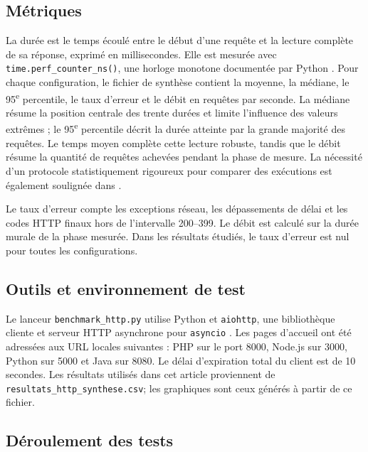 \documentclass[conference,11pt]{IEEEtran}
\begin{document}
\subsection{Métriques}

La durée est le temps écoulé entre le début d'une requête et la lecture
complète de sa réponse, exprimé en millisecondes. Elle est mesurée avec
\texttt{time.perf\_counter\_ns()}, une horloge monotone documentée par Python
\cite{python-time}. Pour chaque
configuration, le fichier de synthèse contient la moyenne, la médiane, le
95\textsuperscript{e} percentile, le taux d'erreur et le débit en requêtes par seconde.
La médiane résume la position centrale des trente durées et limite
l'influence des valeurs extrêmes ; le 95\textsuperscript{e} percentile décrit la durée
atteinte par la grande majorité des requêtes. Le temps moyen complète cette
lecture robuste, tandis que le débit résume la quantité de requêtes achevées
pendant la phase de mesure. La nécessité d'un protocole statistiquement
rigoureux pour comparer des exécutions est également soulignée dans
\cite{georges}.

Le taux d'erreur compte les exceptions réseau, les dépassements de délai et
les codes HTTP finaux hors de l'intervalle 200--399. Le débit est calculé sur
la durée murale de la phase mesurée. Dans les résultats étudiés, le taux
d'erreur est nul pour toutes les configurations.

\subsection{Outils et environnement de test}

Le lanceur \texttt{benchmark\_http.py} utilise Python et \texttt{aiohttp},
une bibliothèque cliente et serveur HTTP asynchrone pour \texttt{asyncio}
\cite{aiohttp}.
Les pages d'accueil ont été adressées aux URL locales suivantes : PHP sur
le port 8000, Node.js sur 3000, Python sur 5000 et Java sur 8080. Le délai
d'expiration total du client est de 10 secondes. Les résultats utilisés dans
cet article proviennent de
\texttt{resultats\_http\_synthese.csv}; les graphiques sont ceux
générés à partir de ce fichier.

\subsection{Déroulement des tests}
\end{document}
